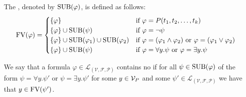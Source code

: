 \begin{definition}\label{def.2.18}
	The , denoted by $\text{SUB}(\varphi)$, is defined as follows:
	\[\text{FV}(\varphi)=
		\begin{cases}
			\{\varphi\} & \text{if $\varphi=P(t_1,t_2,\dots,t_k)$}                               \\
			\{\varphi\}\cup\text{SUB}(\psi)                                 & \text{if $\varphi=\neg\psi$}                               \\
			\{\varphi\}\cup\text{SUB}(\varphi_1)\cup\text{SUB}(\varphi_2)         & \text{if $\varphi=(\varphi_1\wedge\varphi_2)$ or $\varphi=(\varphi_1\vee\varphi_2)$} \\
			\{\varphi\}\cup\text{SUB}(\psi)                  & \text{if $\varphi=\forall y.\psi$ or $\varphi=\exists y.\psi$}                 
		\end{cases}\]
\end{definition}

\begin{definition}\label{def.2.19}
We say that a formula $\varphi\in\mathcal{L}_{(\mathcal{V},\mathcal{F},\mathcal{P})}$ contains no  if for all $\psi\in\text{SUB}(\varphi)$ of the form $\psi=\forall y.\psi'$ or $\psi=\exists y.\psi'$ for some $y\in\mathcal{V}_P$ and some $\psi'\in\mathcal{L}_{(\mathcal{V},\mathcal{F},\mathcal{P})}$ we have that $y\in\text{FV}(\psi')$.
\end{definition}


